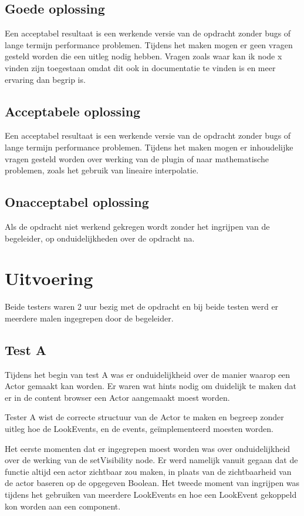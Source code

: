 \subsection{Goede oplossing}
Een acceptabel resultaat is een werkende versie van de opdracht zonder bugs of lange termijn performance problemen. Tijdens het maken mogen er geen vragen gesteld worden die een uitleg nodig hebben. Vragen zoals waar kan ik node x vinden zijn toegestaan omdat dit ook in documentatie te vinden is en meer ervaring dan begrip is. 

\subsection{Acceptabele oplossing}
Een acceptabel resultaat is een werkende versie van de opdracht zonder bugs of lange termijn performance problemen. Tijdens het maken mogen er inhoudelijke vragen gesteld worden over werking van de plugin of naar mathematische problemen, zoals het gebruik van lineaire interpolatie.

\subsection{Onacceptabel oplossing}
Als de opdracht niet werkend gekregen wordt zonder het ingrijpen van de begeleider, op onduidelijkheden over de opdracht na.  

\section{Uitvoering}
Beide testers waren 2 uur bezig met de opdracht en bij beide testen werd er meerdere malen ingegrepen door de begeleider.

\subsection{Test A}
Tijdens het begin van test A was er onduidelijkheid over de manier waarop een Actor gemaakt kan worden. Er waren wat hints nodig om duidelijk te maken dat er in de content browser een Actor aangemaakt moest worden.

Tester A wist de correcte structuur van de Actor te maken en begreep zonder uitleg hoe de LookEvents, en de events, geïmplementeerd moesten worden. 

Het eerste momenten dat er ingegrepen moest worden was over onduidelijkheid over de werking van de setVisibility node. Er werd namelijk vanuit gegaan dat de functie altijd een actor zichtbaar zou maken, in plaats van de zichtbaarheid van de actor baseren op de opgegeven Boolean. Het tweede moment van ingrijpen was tijdens het gebruiken van meerdere LookEvents en hoe een LookEvent gekoppeld kon worden aan een component. 

